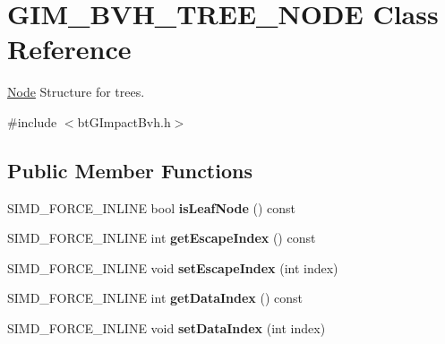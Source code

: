 \hypertarget{class_g_i_m___b_v_h___t_r_e_e___n_o_d_e}{\section{G\+I\+M\+\_\+\+B\+V\+H\+\_\+\+T\+R\+E\+E\+\_\+\+N\+O\+D\+E Class Reference}
\label{class_g_i_m___b_v_h___t_r_e_e___n_o_d_e}
}


\hyperlink{struct_node}{Node} Structure for trees.  




{\ttfamily \#include $<$bt\+G\+Impact\+Bvh.\+h$>$}

\subsection*{Public Member Functions}
\begin{DoxyCompactItemize}
\item 
\hypertarget{class_g_i_m___b_v_h___t_r_e_e___n_o_d_e_a2d7bcedee333edd936f5928b0c6ba3ec}{S\+I\+M\+D\+\_\+\+F\+O\+R\+C\+E\+\_\+\+I\+N\+L\+I\+N\+E bool {\bfseries is\+Leaf\+Node} () const }\label{class_g_i_m___b_v_h___t_r_e_e___n_o_d_e_a2d7bcedee333edd936f5928b0c6ba3ec}

\item 
\hypertarget{class_g_i_m___b_v_h___t_r_e_e___n_o_d_e_af10965e0dd7d7dbd6ed00ed4b56a3bbe}{S\+I\+M\+D\+\_\+\+F\+O\+R\+C\+E\+\_\+\+I\+N\+L\+I\+N\+E int {\bfseries get\+Escape\+Index} () const }\label{class_g_i_m___b_v_h___t_r_e_e___n_o_d_e_af10965e0dd7d7dbd6ed00ed4b56a3bbe}

\item 
\hypertarget{class_g_i_m___b_v_h___t_r_e_e___n_o_d_e_af6939dcb5f2a0cb3d7440cfb68449369}{S\+I\+M\+D\+\_\+\+F\+O\+R\+C\+E\+\_\+\+I\+N\+L\+I\+N\+E void {\bfseries set\+Escape\+Index} (int index)}\label{class_g_i_m___b_v_h___t_r_e_e___n_o_d_e_af6939dcb5f2a0cb3d7440cfb68449369}

\item 
\hypertarget{class_g_i_m___b_v_h___t_r_e_e___n_o_d_e_a8469cb46f04e89b0793eddf8a369ed56}{S\+I\+M\+D\+\_\+\+F\+O\+R\+C\+E\+\_\+\+I\+N\+L\+I\+N\+E int {\bfseries get\+Data\+Index} () const }\label{class_g_i_m___b_v_h___t_r_e_e___n_o_d_e_a8469cb46f04e89b0793eddf8a369ed56}

\item 
\hypertarget{class_g_i_m___b_v_h___t_r_e_e___n_o_d_e_a38cbb23bb5f8939b936af9245b09661c}{S\+I\+M\+D\+\_\+\+F\+O\+R\+C\+E\+\_\+\+I\+N\+L\+I\+N\+E void {\bfseries set\+Data\+Index} (int index)}\label{class_g_i_m___b_v_h___t_r_e_e___n_o_d_e_a38cbb23bb5f8939b936af9245b09661c}

\end{DoxyCompactItemize}
